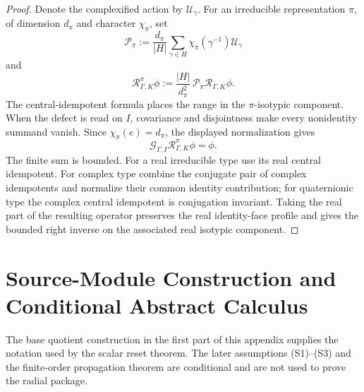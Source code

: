 \documentclass[11pt]{amsart}
\theoremstyle{compactplain}
\theoremstyle{compactdefinition}
\theoremstyle{compactremark}
\begin{document}
\begin{proof}
Denote the complexified action by \(\mathcal U_\gamma\).  For an irreducible
representation \(\pi\), of dimension \(d_\pi\) and character \(\chi_\pi\), set
\[
 \mathcal P_\pi
 :=\frac{d_\pi}{|H|}
   \sum_{\gamma\in H}\chi_\pi(\gamma^{-1})\mathcal U_\gamma
\]
and
\begin{equation}
\label{eq:isotypic_gluing_right_inverse}
 \mathcal R_{\Gamma,K}^{\pi}\phi
 :=\frac{|H|}{d_\pi^2}\,
   \mathcal P_\pi\mathcal R_{\Gamma,K}\phi .
\end{equation}
The central-idempotent formula places the range in the \(\pi\)-isotypic
component.  When the defect is read on \(I\), covariance and disjointness make
every nonidentity summand vanish.  Since \(\chi_\pi(e)=d_\pi\), the displayed
normalization gives
\[
 \mathcal G_{\Gamma,I}\mathcal R_{\Gamma,K}^{\pi}\phi=\phi.
\]
The finite sum is bounded.  For a real irreducible type use its real central
idempotent.  For complex type combine the conjugate pair of complex
idempotents and normalize their common identity contribution; for quaternionic
type the complex central idempotent is conjugation invariant.  Taking the real
part of the resulting operator preserves the real identity-face profile and
gives the bounded right inverse on the associated real isotypic component.
\end{proof}




\section{Source-Module Construction and Conditional Abstract Calculus}

The base quotient construction in the first part of this appendix supplies
the notation used by the scalar reset theorem.  The later assumptions
(S1)--(S3) and the finite-order propagation theorem are conditional and are
not used to prove the radial package.
\end{document}
